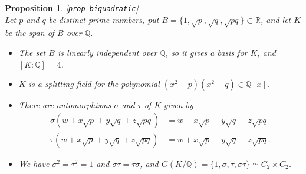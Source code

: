\documentclass{amsart}
\newcommand{\lbl}[1]{\label{#1}\textup{[\texttt{#1}]}\ \\}
\newcommand{\lbl}{\label}
\newcommand{\Q}         {{\mathbb{Q}}}
\newcommand{\R}         {{\mathbb{R}}}
\newcommand{\sg}        {\sigma}
\newcommand{\tm}        {\times}
\renewcommand{\:}{\colon}
\newtheorem{proposition}[theorem]{Proposition}
\theoremstyle{definition}
\begin{document}
\begin{proposition}\lbl{prop-biquadratic}
 Let $p$ and $q$ be distinct prime numbers, put
 $B=\{1,\sqrt{p},\sqrt{q},\sqrt{pq}\}\subset\R$, and let $K$ be the
 span of $B$ over $\Q$.
 \begin{itemize}
  \item[(a)] The set $B$ is linearly independent over $\Q$, so it
   gives a basis for $K$, and $[K:\Q]=4$.
  \item[(b)] $K$ is a splitting field for the polynomial
   $(x^2-p)(x^2-q)\in\Q[x]$.  
  \item[(c)] There are automorphisms $\sg$ and $\tau$ of $K$ given by 
   \begin{align*}
    \sg(w+x\sqrt{p}+y\sqrt{q}+z\sqrt{pq}) 
     &= w-x\sqrt{p}+y\sqrt{q}-z\sqrt{pq} \\
    \tau(w+x\sqrt{p}+y\sqrt{q}+z\sqrt{pq}) 
     &= w+x\sqrt{p}-y\sqrt{q}-z\sqrt{pq}.
   \end{align*}
  \item[(d)] We have $\sg^2=\tau^2=1$ and $\sg\tau=\tau\sg$, and
   $G(K/\Q)=\{1,\sg,\tau,\sg\tau\}\simeq C_2\tm C_2$.
 \end{itemize}
\end{proposition}
\end{document}
